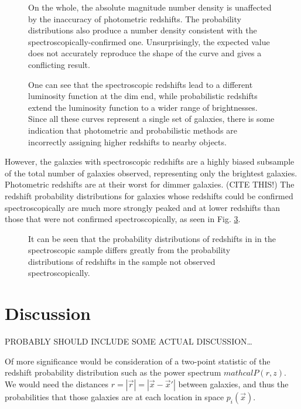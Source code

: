\documentclass[12pt, onecolumn]{emulateapj}
\begin{document}
\begin{figure}
\caption{On the whole, the absolute magnitude number density is unaffected by the inaccuracy of photometric redshifts.  The probability distributions also produce a number density consistent with the spectroscopically-confirmed one.  Unsurprisingly, the expected value does not accurately reproduce the shape of the curve and gives a conflicting result.  \label{fig:lfs-spec}}
\end{figure}

\begin{figure}
\caption{One can see that the spectroscopic redshifts lead to a different luminosity function at the dim end, while probabilistic redshifts extend the luminosity function to a wider range of brightnesses.  Since all these curves represent a single set of galaxies, there is some indication that photometric and probabilistic methods are incorrectly assigning higher redshifts to nearby objects.   \label{fig:lfs-spec-vol}}
\end{figure}

However, the galaxies with spectroscopic redshifts are a highly biased subsample of the total number of galaxies observed, representing only the brightest galaxies.  Photometric redshifts are at their worst for dimmer galaxies.  (CITE THIS!)  The redshift probability distributions for galaxies whose redshifts could be confirmed spectroscopically are much more strongly peaked and at lower redshifts than those that were not confirmed spectroscopically, as seen in Fig. \ref{fig:zdists}.

\begin{figure}
\caption{It can be seen that the probability distributions of redshifts in in the spectroscopic sample differs greatly from the probability distributions of redshifts in the sample not observed spectroscopically.  \label{fig:zdists}}
\end{figure}

\section{Discussion}

PROBABLY SHOULD INCLUDE SOME ACTUAL DISCUSSION\dots

Of more significance would be consideration of a two-point statistic of the redshift probability distribution such as the power spectrum $mathcal{P}(r,z)$.  We would need the distances $r=|\vec{r}|=|\vec{x}-\vec{x}'|$ between galaxies, and thus the probabilities that those galaxies are at each location in space $p_{i}(\vec{x})$.  
\end{document}
